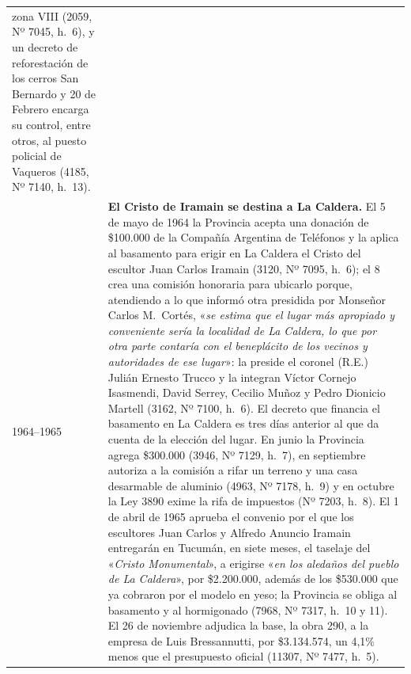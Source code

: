 \begin{longtable}{@{}p{2.7cm}p{10.3cm}@{}}
zona VIII (2059, Nº 7045, h.\ 6), y un decreto de reforestación de los cerros San Bernardo y 20 de Febrero encarga su control, entre otros, al puesto policial de Vaqueros (4185, Nº 7140, h.\ 13). \\
1964--1965 & \textbf{El Cristo de Iramain se destina a La Caldera.} El 5 de mayo de 1964 la Provincia acepta una donación de \$100.000 de la Compañía Argentina de Teléfonos y la aplica al basamento para erigir en La Caldera el Cristo del escultor Juan Carlos Iramain (3120, Nº 7095, h.\ 6); el 8 crea una comisión honoraria para ubicarlo porque, atendiendo a lo que informó otra presidida por Monseñor Carlos M.\ Cortés, «\textit{se estima que el lugar más apropiado y conveniente sería la localidad de La Caldera, lo que por otra parte contaría con el beneplácito de los vecinos y autoridades de ese lugar}»: la preside el coronel (R.E.) Julián Ernesto Trucco y la integran Víctor Cornejo Isasmendi, David Serrey\index{Serrey, David}, Cecilio Muñoz y Pedro Dionicio Martell (3162, Nº 7100, h.\ 6). El decreto que financia el basamento en La Caldera es tres días anterior al que da cuenta de la elección del lugar. En junio la Provincia agrega \$300.000 (3946, Nº 7129, h.\ 7), en septiembre autoriza a la comisión a rifar un terreno y una casa desarmable de aluminio (4963, Nº 7178, h.\ 9) y en octubre la Ley 3890 exime la rifa de impuestos (Nº 7203, h.\ 8). El 1 de abril de 1965 aprueba el convenio por el que los escultores Juan Carlos y Alfredo Anuncio Iramain entregarán en Tucumán, en siete meses, el taselaje del «\textit{Cristo Monumental}», a erigirse «\textit{en los aledaños del pueblo de La Caldera}», por \$2.200.000, además de los \$530.000 que ya cobraron por el modelo en yeso; la Provincia se obliga al basamento y al hormigonado (7968, Nº 7317, h.\ 10 y 11). El 26 de noviembre adjudica la base, la obra 290, a la empresa de Luis Bressannutti, por \$3.134.574, un 4,1\% menos que el presupuesto oficial (11307, Nº 7477, h.\ 5). \\

\end{longtable}

